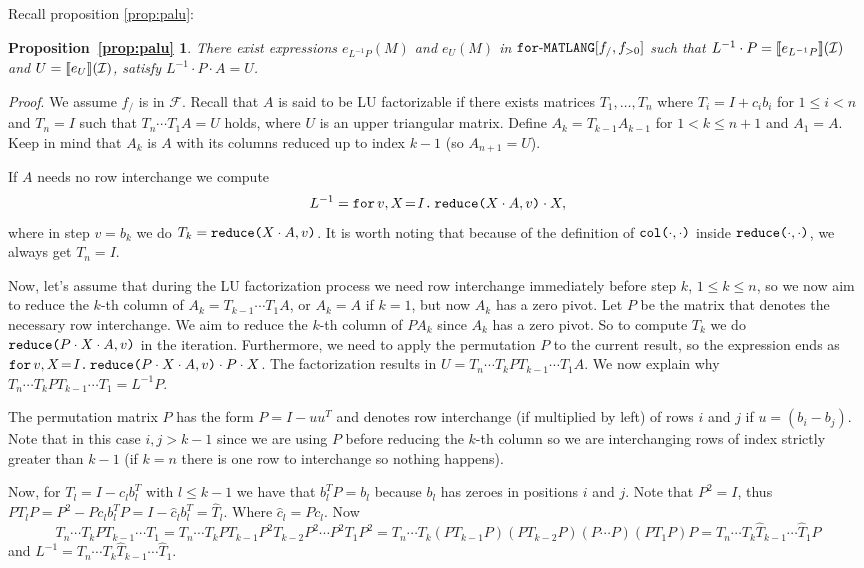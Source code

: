 \newtheorem*{PALU}{Proposition~\ref{prop:palu}}

Recall proposition \ref{prop:palu}:

\begin{PALU}
  There exist expressions $e_{L^{-1}P}(M)$ and $e_U(M)$ in $\langforf{f_/,f_{>0}}$  such that
  $L^{-1}\cdot P=\sem{e_{L^{-1}P}}{\I}$ and $U=\sem{e_U}{\I}$, satisfy $L^{-1}\cdot P\cdot A=U$.
\end{PALU}

\textit{Proof}. We assume $f_{/}$ is in $\mathcal{F}$. Recall that $A$ is said to be LU factorizable if there exists matrices 
$T_1,\ldots, T_{n}$ where $T_i=I+c_ib_i$ for $1\leq i < n$ and $T_n=I$ such that $T_{n}\cdots T_1A=U$ holds, 
where $U$ is an upper triangular matrix. Define $A_k=T_{k-1}A_{k-1}$ for $1< k\leq n+1$ and $A_1=A$. Keep in 
mind that $A_k$ is $A$ with its columns reduced up to index $k-1$ (so $A_{n+1}=U$). 

If $A$ needs no row interchange we compute
$$
L^{-1}=\initf{I}{v}{X}{\red{X\cdot A}{v}\cdot X},
$$
where in step $v=b_k$ we do $T_k=\red{X\cdot A}{v}$. 
It is worth noting that because of the definition of $\ccol{\cdot}{\cdot}$ inside $\red{\cdot}{\cdot}$, 
we always get $T_n=I$.

Now, let's assume that during the LU factorization process we need row interchange immediately before 
step $k$, $1\leq k\leq n$, so we now aim to reduce the $k$-th column of $A_k=T_{k-1}\cdots T_1A$, 
or $A_k=A$ if $k=1$, but now $A_k$ has a zero pivot. 
Let $P$ be the matrix that denotes the necessary row interchange. 
We aim to reduce the $k$-th column of $PA_{k}$ since $A_{k}$ has a zero pivot. 
So to compute $T_k$ we do $\red{P\cdot X\cdot A}{v}$ in the iteration. 
Furthermore, we need to apply the permutation $P$ to the current result, 
so the expression ends as $\initf{I}{v}{X}{\red{P\cdot X\cdot A}{v}\cdot P\cdot X}$.
The factorization results in $U=T_{n}\cdots T_kPT_{k-1}\cdots T_1A$. 
We now explain why $T_{n}\cdots T_kPT_{k-1}\cdots T_1 = L^{-1}P.$ 

The permutation matrix $P$ has the form $P = I - uu^T$ and denotes row interchange (if multiplied by left) 
of rows $i$ and $j$ if $u=(b_{i}-b_{j})$. Note that in this case $i,j>k-1$ since we are using $P$ before 
reducing the $k$-th column so we are interchanging rows of index strictly greater than $k-1$ (if $k=n$ there 
is one row to interchange so nothing happens).

Now, for $T_{l}=I-c_lb_l^T$ with $l\leq k-1$ we have that $b_l^TP=b_l$ because $b_l$ has zeroes in positions 
$i$ and $j$. Note that $P^2=I$, thus $PT_lP=P^2-Pc_lb_l^TP=I-\widehat{c}_lb_l^T=\widehat{T}_l.$ Where 
$\widehat{c}_l=Pc_l$. Now
$$
T_{n}\cdots T_kPT_{k-1}\cdots T_1=T_{n}\cdots T_kPT_{k-1}P^2T_{k-2}P^2\cdots P^2 T_1P^2=T_{n}\cdots T_k(PT_{k-1}P)(PT_{k-2}P)(P\cdots P)(PT_1P)P=T_{n}\cdots T_k\widehat{T}_{k-1}\cdots \widehat{T}_1P
$$
and $L^{-1} = T_{n}\cdots T_k\widehat{T}_{k-1}\cdots \widehat{T}_1$.

